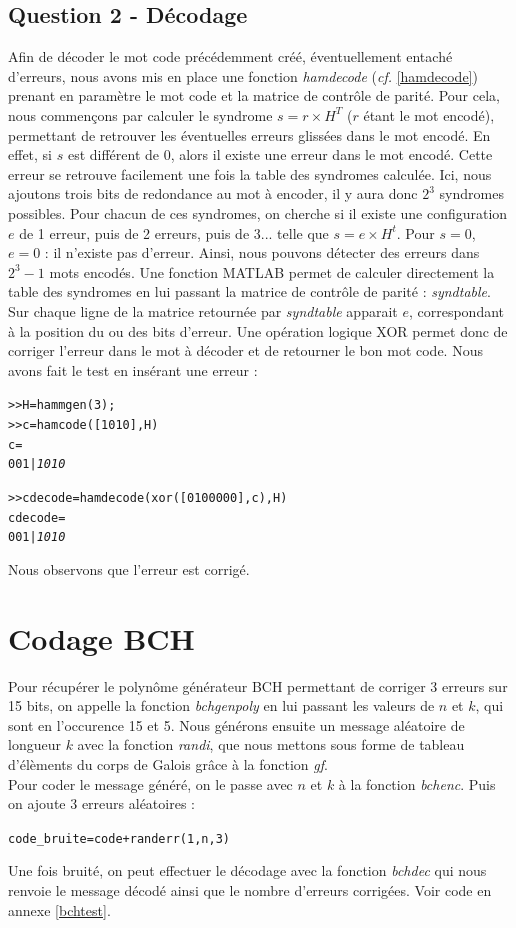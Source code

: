 \documentclass[a4paper, 12pt]{article}
\begin{document}
\subsection{Question 2 - Décodage}

Afin de décoder le mot code précédemment créé, éventuellement entaché d'erreurs, nous avons mis en place une fonction \textit{hamdecode} (\textit{cf.} \ref{hamdecode}) prenant en paramètre le mot code et la matrice de contrôle de parité.
Pour cela, nous commençons par calculer le syndrome $s = r\times H^T$ ($r$ étant le mot encodé), permettant de retrouver les éventuelles erreurs glissées dans le mot encodé. En effet, si $s$ est différent de 0, alors il existe une erreur dans le mot encodé. Cette erreur se retrouve facilement une fois la table des syndromes calculée.
Ici, nous ajoutons trois bits de redondance au mot à encoder, il y aura donc $2^3$ syndromes possibles. Pour chacun de ces syndromes, on cherche si il existe une configuration $e$ de 1 erreur, puis de 2 erreurs, puis de 3... telle que $s = e \times H^t$. Pour $s=0$, $e=0$ : il n'existe pas d'erreur. Ainsi, nous pouvons détecter des erreurs dans $2^3 - 1$ mots encodés. Une fonction MATLAB permet de calculer directement la table des syndromes en lui passant la matrice de contrôle de parité : \textit{syndtable}. Sur chaque ligne de la matrice retournée par \textit{syndtable} apparait $e$, correspondant à la position du ou des bits d'erreur. Une opération logique XOR permet donc de corriger l'erreur dans le mot à décoder et de retourner le bon mot code. Nous avons fait le test en insérant une erreur :
\begin{alltt}
>> H = hammgen(3); %
>> c = hamcode([1 0 1 0], H) %
c =
     0     0     1   |   \textit{1     0     1     0}
		
>> cdecode = hamdecode( xor([0 1 0 0 0 0 0], c), H)
cdecode =
     0     0     1   |   \textit{1     0     1     0}
\end{alltt}

Nous observons que l'erreur est corrigé.

\section{Codage BCH}

Pour récupérer le polynôme générateur BCH permettant de corriger 3 erreurs sur 15 bits, on appelle la fonction \textit{bchgenpoly} en lui passant les valeurs de $n$ et $k$, qui sont en l'occurence 15 et 5. Nous générons ensuite un message aléatoire de longueur $k$ avec la fonction \textit{randi}, que nous mettons sous forme de tableau d'élèments du corps de Galois grâce à la fonction \textit{gf}. \\
Pour coder le message généré, on le passe avec $n$ et $k$ à la fonction \textit{bchenc}. Puis on ajoute 3 erreurs aléatoires :
\begin{alltt}
code_bruite = code + randerr(1,n,3)
\end{alltt}
Une fois bruité, on peut effectuer le décodage avec la fonction \textit{bchdec} qui nous renvoie le message décodé ainsi que le nombre d'erreurs corrigées.
Voir code en annexe \ref{bchtest}.
\end{document}
